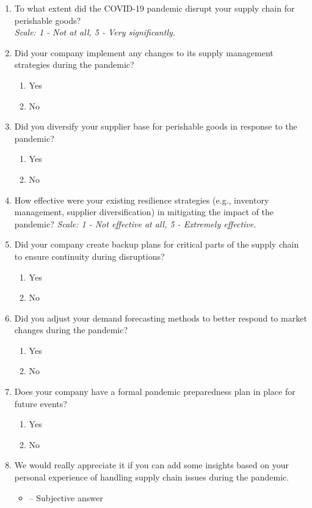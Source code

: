 \begin{enumerate}[label=\textbf{Q\arabic*:},leftmargin=*]
    \item To what extent did the COVID-19 pandemic disrupt your supply chain for perishable goods?\\
    \textit{Scale: 1 - Not at all, 5 - Very significantly.}
    
    \item Did your company implement any changes to its supply management strategies during the pandemic?
    \begin{enumerate}[label=\arabic*., leftmargin=2em]
        \item Yes
        \item No
    \end{enumerate}
    
    \item Did you diversify your supplier base for perishable goods in response to the pandemic?
    \begin{enumerate}[label=\arabic*., leftmargin=2em]
        \item Yes
        \item No
    \end{enumerate}
    
    \item How effective were your existing resilience strategies (e.g., inventory management, supplier diversification) in mitigating the impact of the pandemic?
    \textit{Scale: 1 - Not effective at all, 5 - Extremely effective.}
    
    \item Did your company create backup plans for critical parts of the supply chain to ensure continuity during disruptions?
    \begin{enumerate}[label=\arabic*., leftmargin=2em]
        \item Yes
        \item No
    \end{enumerate}
    
    \item Did you adjust your demand forecasting methods to better respond to market changes during the pandemic?
    \begin{enumerate}[label=\arabic*., leftmargin=2em]
        \item Yes
        \item No
    \end{enumerate}
    
    \item Does your company have a formal pandemic preparedness plan in place for future events?
    \begin{enumerate}[label=\arabic*., leftmargin=2em]
        \item Yes
        \item No
    \end{enumerate}
    
    \item We would really appreciate it if you can add some insights based on your personal experience of handling supply chain issues during the pandemic.
    \begin{itemize}[leftmargin=2em]
        \item -- Subjective answer
    \end{itemize}
\end{enumerate}

